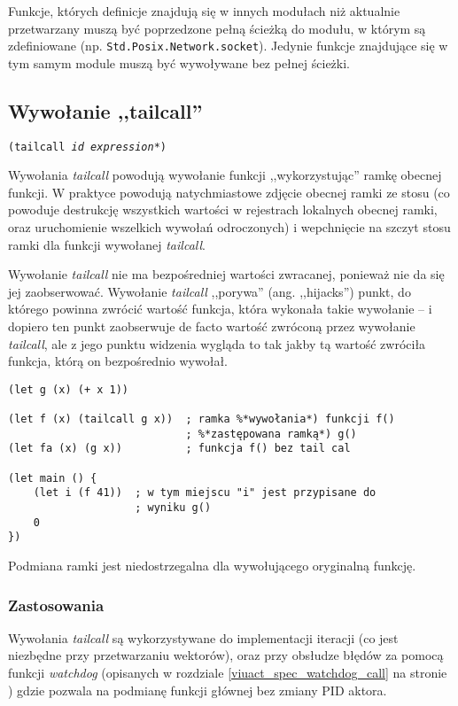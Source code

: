 Funkcje, których definicje znajdują się w innych modułach niż aktualnie
przetwarzany muszą być poprzedzone pełną ścieżką do modułu, w którym są
zdefiniowane (np. \texttt{Std.Posix.Network.socket}). Jedynie funkcje znajdujące
się w tym samym module muszą być wywoływane bez pełnej ścieżki.

\subsection{Wywołanie ,,tailcall''}
\label{viuact_spec_tail_call}

\texttt{(tailcall \emph{id} \emph{expression}*)}
\newline

Wywołania \emph{tailcall} powodują wywołanie funkcji ,,wykorzystując'' ramkę
obecnej funkcji. W praktyce powodują natychmiastowe zdjęcie obecnej ramki ze
stosu (co powoduje destrukcję wszystkich wartości w rejestrach lokalnych obecnej
ramki, oraz uruchomienie wszelkich wywołań odroczonych) i wepchnięcie na szczyt
stosu ramki dla funkcji wywołanej \emph{tailcall}.

Wywołanie \emph{tailcall} nie ma bezpośredniej wartości zwracanej, ponieważ nie
da się jej zaobserwować. Wywołanie \emph{tailcall} ,,porywa'' (ang. ,,hijacks'')
punkt, do którego powinna zwrócić wartość funkcja, która wykonała takie
wywołanie -- i dopiero ten punkt zaobserwuje de facto wartość zwróconą przez
wywołanie \emph{tailcall}, ale z jego punktu widzenia wygląda to tak jakby tą
wartość zwróciła funkcja, którą on bezpośrednio wywołał.

\begin{lstlisting}
(let g (x) (+ x 1))

(let f (x) (tailcall g x))  ; ramka %*wywołania*) funkcji f()
                            ; %*zastępowana ramką*) g()
(let fa (x) (g x))          ; funkcja f() bez tail cal

(let main () {
    (let i (f 41))  ; w tym miejscu "i" jest przypisane do
                    ; wyniku g()
    0
})
\end{lstlisting}

Podmiana ramki jest niedostrzegalna dla wywołującego oryginalną funkcję.

\subsubsection{Zastosowania}

Wywołania \emph{tailcall} są wykorzystywane do implementacji iteracji (co jest
niezbędne przy przetwarzaniu wektorów), oraz przy obsłudze błędów za pomocą
funkcji \emph{watchdog} (opisanych w rozdziale \ref{viuact_spec_watchdog_call}
na stronie \pageref{viuact_spec_watchdog_call}) gdzie pozwala na podmianę
funkcji głównej bez zmiany PID aktora.

